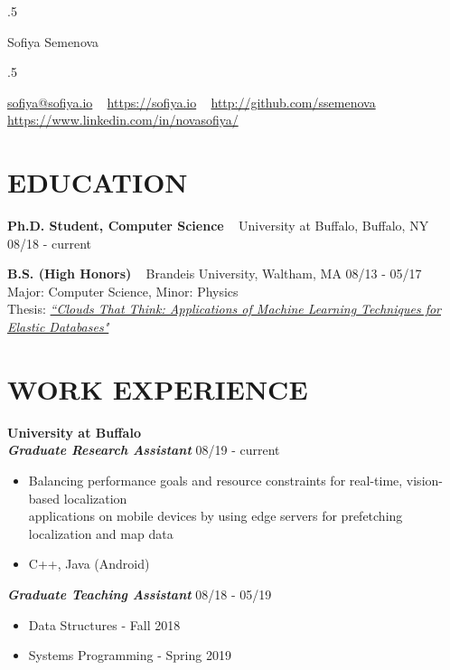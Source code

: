 \documentclass{res}
\begin{document}
 \moveleft.5\hoffset\centerline{\namefont Sofiya Semenova}
 \smallskip
 \moveleft.5\hoffset\centerline{\href{mailto:sofiya@sofiya.io}{sofiya@sofiya.io} ~ \href{https://sofiya.io}{https://sofiya.io} ~ \href{http://github.com/ssemenova}{http://github.com/ssemenova} ~ \href{https://www.linkedin.com/in/novasofiya/}{https://www.linkedin.com/in/novasofiya/}}


\vspace{2mm}

\begin{resume}


\section{EDUCATION}
\vspace{2mm}
\textbf{Ph.D. Student, Computer Science} ~ University at Buffalo, Buffalo, NY \hfill 08/18 - current

\textbf{B.S. (High Honors)} ~ Brandeis University, Waltham, MA \hfill 08/13 - 05/17 \\
	Major: Computer Science, Minor: Physics \\
	Thesis: \href{https://sofiya.io/media/thesis.pdf}{\sl “Clouds That Think: Applications of Machine Learning Techniques for Elastic Databases"}
\vspace{2mm}

\section{WORK EXPERIENCE}
\vspace{2mm}
\textbf{\large{University at Buffalo}}
\vspace{1mm} \\
\textbf{\textit{Graduate Research Assistant} }\hfill 08/19 - current \\
	\begin{itemize}   \itemsep -1pt %
	\item Balancing performance goals and resource constraints for real-time, vision-based localization \\
	applications on mobile devices by using edge servers for prefetching localization and map data
	\item C++, Java (Android)
	\end{itemize}
\textbf{\textit{Graduate Teaching Assistant}}  \hfill 08/18 - 05/19 \\ 
	\begin{itemize}  \itemsep -1pt %
	\item Data Structures - Fall 2018
	\item Systems Programming - Spring 2019
	\end{itemize}
\vspace{3mm}


\end{resume}
\end{document}
